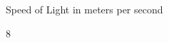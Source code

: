 \documentclass[10pt]{examdesign}
\begin{document}
	\begin{shortanswer}[title={Short Answer (10 pts each)}, rearrange=yes,resetcounter=no]
		\begin{question}
			Speed of Light in meters per second
			\begin{answer}
				8
			\end{answer}
		\end{question}
	\end{shortanswer}
\end{document}
